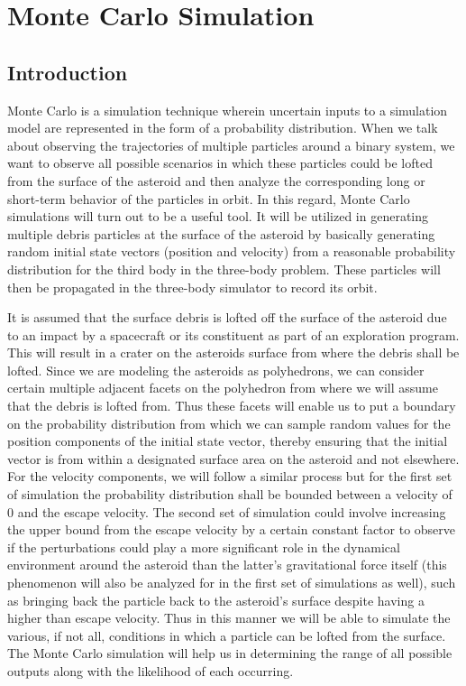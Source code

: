 \chapter{Monte Carlo Simulation}
\label{MCS}
\graphicspath{{chapter-7/Images/}}

\section{Introduction}
Monte Carlo is a simulation technique wherein uncertain inputs to a simulation model are represented in the form of a probability distribution. When we talk about observing the trajectories of multiple particles around a binary system, we want to observe all possible scenarios in which these particles could be lofted from the surface of the asteroid and then analyze the corresponding long or short-term behavior of the particles in orbit. In this regard, Monte Carlo simulations will turn out to be a useful tool. It will be utilized in generating multiple debris particles at the surface of the asteroid by basically generating random initial state vectors (position and velocity) from a reasonable probability distribution for the third body in the three-body problem. These particles will then be propagated in the three-body simulator to record its orbit.

It is assumed that the surface debris is lofted off the surface of the asteroid due to an impact by a spacecraft or its constituent as part of an exploration program. This will result in a crater on the asteroids surface from where the debris shall be lofted. Since we are modeling the asteroids as polyhedrons, we can consider certain multiple adjacent facets on the polyhedron from where we will assume that the debris is lofted from. Thus these facets will enable us to put a boundary on the probability distribution from which we can sample random values for the position components of the initial state vector, thereby ensuring that the initial vector is from within a designated surface area on the asteroid and not elsewhere. For the velocity components, we will follow a similar process but for the first set of simulation the probability distribution shall be bounded between a velocity of 0 and the escape velocity. The second set of simulation could involve increasing the upper bound from the escape velocity by a certain constant factor to observe if the perturbations could play a more significant role in the dynamical environment around the asteroid than the latter's gravitational force itself (this phenomenon will also be analyzed for in the first set of simulations as well), such as bringing back the particle back to the asteroid's surface despite having a higher than escape velocity. Thus in this manner we will be able to simulate the various, if not all, conditions in which a particle can be lofted from the surface. The Monte Carlo simulation will help us in determining the range of all possible outputs along with the likelihood of each occurring.

